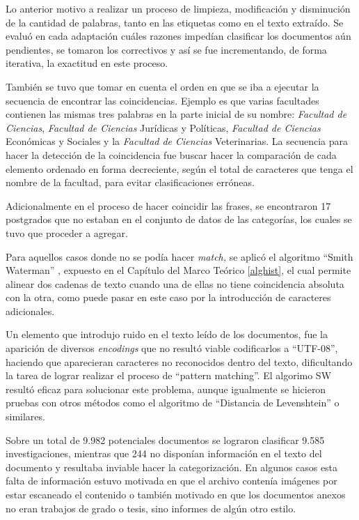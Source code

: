 \documentclass[
  12pt,
  openany]{book}
\begin{document}
Lo anterior motivo a realizar un proceso de limpieza, modificación y disminución de la cantidad de palabras, tanto en las etiquetas como en el texto extraído. Se evaluó en cada adaptación cuáles razones impedían clasificar los documentos aún pendientes, se tomaron los correctivos y así se fue incrementando, de forma iterativa, la exactitud en este proceso.

También se tuvo que tomar en cuenta el orden en que se iba a ejecutar la secuencia de encontrar las coincidencias. Ejemplo es que varias facultades contienen las mismas tres palabras en la parte inicial de su nombre: \emph{Facultad de Ciencias}, \emph{Facultad de Ciencias} Jurídicas y Políticas, \emph{Facultad de Ciencias} Económicas y Sociales y la \emph{Facultad de Ciencias} Veterinarias. La secuencia para hacer la detección de la coincidencia fue buscar hacer la comparación de cada elemento ordenado en forma decreciente, según el total de caracteres que tenga el nombre de la facultad, para evitar clasificaciones erróneas.

Adicionalmente en el proceso de hacer coincidir las frases, se encontraron 17 postgrados que no estaban en el conjunto de datos de las categorías, los cuales se tuvo que proceder a agregar.

Para aquellos casos donde no se podía hacer \emph{match,} se aplicó el algoritmo ``Smith Waterman'' \citep{smith1981}, expuesto en el Capítulo del Marco Teórico \ref{alghist}, el cual permite alinear dos cadenas de texto cuando una de ellas no tiene coincidencia absoluta con la otra, como puede pasar en este caso por la introducción de caracteres adicionales.

Un elemento que introdujo ruido en el texto leído de los documentos, fue la aparición de diversos \emph{encodings} que no resultó viable codificarlos a ``UTF-08'', haciendo que aparecieran caracteres no reconocidos dentro del texto, dificultando la tarea de lograr realizar el proceso de ``pattern matching''. El algorimo SW resultó eficaz para solucionar este problema, aunque igualmente se hicieron pruebas con otros métodos como el algoritmo de ``Distancia de Levenshtein'' o similares.

Sobre un total de 9.982 potenciales documentos se lograron clasificar 9.585 investigaciones, mientras que 244 no disponían información en el texto del documento y resultaba inviable hacer la categorización. En algunos casos esta falta de información estuvo motivada en que el archivo contenía imágenes por estar escaneado el contenido o también motivado en que los documentos anexos no eran trabajos de grado o tesis, sino informes de algún otro estilo.
\end{document}
